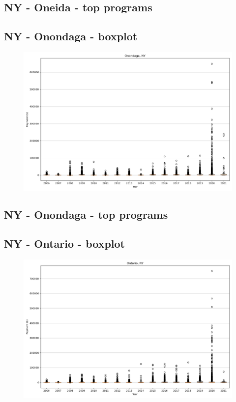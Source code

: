 \subsection*{NY - Oneida - top programs}

\newpage
\subsection*{NY - Onondaga - boxplot}
\begin{figure}[h]
\centering
\includegraphics[width=7in]{../output/boxplots/counties/Onondaga-NY_boxplot.png}
\end{figure}


\subsection*{NY - Onondaga - top programs}

\newpage
\subsection*{NY - Ontario - boxplot}
\begin{figure}[h]
\centering
\includegraphics[width=7in]{../output/boxplots/counties/Ontario-NY_boxplot.png}
\end{figure}


